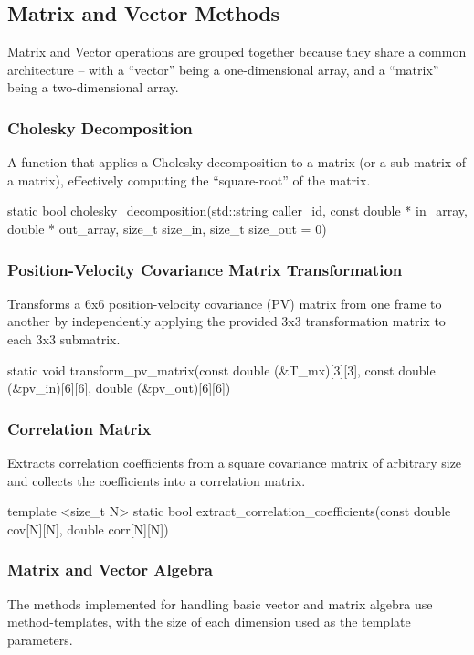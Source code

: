 \documentclass[11pt,fleqn]{report}
\begin{document}
\subsection {Matrix and Vector Methods}
Matrix and Vector operations are grouped together because they share a
common architecture -- with a ``vector'' being a one-dimensional array, and a
``matrix'' being a two-dimensional array.

\subsubsection{Cholesky Decomposition}
A function that applies a Cholesky decomposition to a matrix (or a sub-matrix
of a matrix), effectively computing the ``square-root'' of the matrix.
\begin{code}
static bool cholesky_decomposition(std::string caller_id,
                                   const double * in_array,
                                   double * out_array,
                                   size_t size_in,
                                   size_t size_out = 0)
\end{code}

\subsubsection{Position-Velocity Covariance Matrix Transformation}
Transforms a 6x6 position-velocity covariance (PV) matrix from one frame to another
by independently applying the provided 3x3 transformation matrix to each 3x3 
submatrix.
\begin{code}
static void transform_pv_matrix(const double (&T_mx)[3][3],
                                const double (&pv_in)[6][6],
                                double (&pv_out)[6][6])
\end{code}

\subsubsection{Correlation Matrix}
Extracts correlation coefficients from a square covariance matrix of arbitrary size
and collects the coefficients into a correlation matrix.
\begin{code}
template <size_t N>
static bool extract_correlation_coefficients(const double cov[N][N],
                                             double corr[N][N])
\end{code}

\subsubsection {Matrix and Vector Algebra}\label{sec:spec:matrix_methods}
The methods implemented for handling basic vector and matrix algebra use
method-templates, with the size of each dimension used as the template
parameters.
\end{document}
